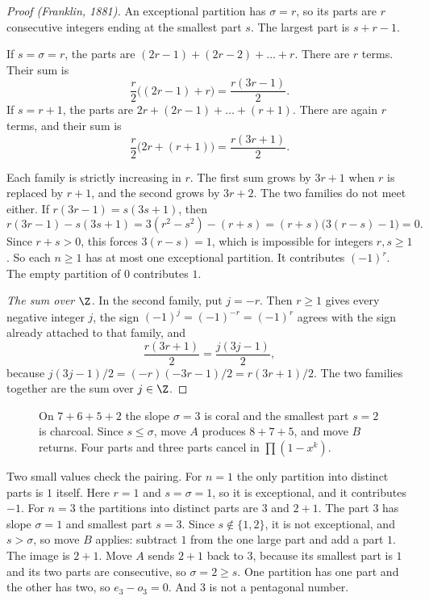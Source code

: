 \begin{proof}[Proof (Franklin, 1881)]
An exceptional partition has $\sigma=r$, so its parts are $r$ consecutive integers ending at the smallest part $s$. The largest part is $s+r-1$.

If $s=\sigma=r$, the parts are $(2r-1)+(2r-2)+\dots+r$. There are $r$ terms. Their sum is
\[
\frac r2\bigl((2r-1)+r\bigr)=\frac{r(3r-1)}2.
\]
If $s=r+1$, the parts are $2r+(2r-1)+\dots+(r+1)$. There are again $r$ terms, and their sum is
\[
\frac r2\bigl(2r+(r+1)\bigr)=\frac{r(3r+1)}2.
\]

Each family is strictly increasing in $r$. The first sum grows by $3r+1$ when $r$ is replaced by $r+1$, and the second grows by $3r+2$. The two families do not meet either. If $r(3r-1)=s(3s+1)$, then
\[
r(3r-1)-s(3s+1)=3(r^2-s^2)-(r+s)=(r+s)\bigl(3(r-s)-1\bigr)=0.
\]
Since $r+s>0$, this forces $3(r-s)=1$, which is impossible for integers $r,s\ge1$. So each $n\ge1$ has at most one exceptional partition. It contributes $(-1)^r$. The empty partition of $0$ contributes $1$.

\emph{The sum over $\Z$.}
In the second family, put $j=-r$. Then $r\ge1$ gives every negative integer $j$, the sign $(-1)^j=(-1)^{-r}=(-1)^r$ agrees with the sign already attached to that family, and
\[
\frac{r(3r+1)}2=\frac{j(3j-1)}2,
\]
because $j(3j-1)/2=(-r)(-3r-1)/2=r(3r+1)/2$. The two families together are the sum over $j\in\Z$.
\end{proof}

\begin{figure}[ht]
\centering
{}
\caption{On $7+6+5+2$ the slope $\sigma=3$ is coral and the smallest part $s=2$ is charcoal. Since $s\le\sigma$, move $A$ produces $8+7+5$, and move $B$ returns. Four parts and three parts cancel in $\prod(1-x^k)$.}
\label{fig:franklin}
\end{figure}

Two small values check the pairing. For $n=1$ the only partition into distinct parts is $1$ itself. Here $r=1$ and $s=\sigma=1$, so it is exceptional, and it contributes $-1$. For $n=3$ the partitions into distinct parts are $3$ and $2+1$. The part $3$ has slope $\sigma=1$ and smallest part $s=3$. Since $s\notin\{1,2\}$, it is not exceptional, and $s>\sigma$, so move $B$ applies: subtract $1$ from the one large part and add a part $1$. The image is $2+1$. Move $A$ sends $2+1$ back to $3$, because its smallest part is $1$ and its two parts are consecutive, so $\sigma=2\ge s$. One partition has one part and the other has two, so $e_3-o_3=0$. And $3$ is not a pentagonal number.

